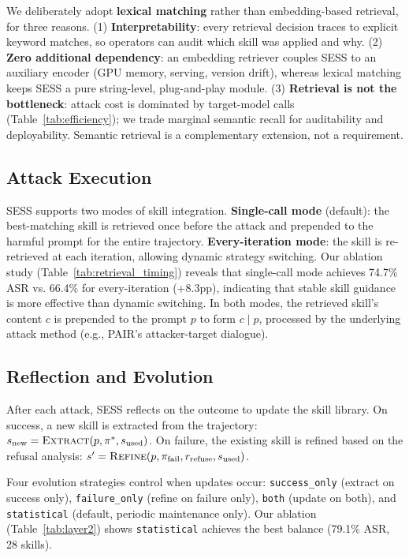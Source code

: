 \documentclass{article} %
\begin{document}
We deliberately adopt \textbf{lexical matching} rather than embedding-based retrieval, for three reasons. (1) \textbf{Interpretability}: every retrieval decision traces to explicit keyword matches, so operators can audit which skill was applied and why. (2) \textbf{Zero additional dependency}: an embedding retriever couples SESS to an auxiliary encoder (GPU memory, serving, version drift), whereas lexical matching keeps SESS a pure string-level, plug-and-play module. (3) \textbf{Retrieval is not the bottleneck}: attack cost is dominated by target-model calls (Table~\ref{tab:efficiency}); we trade marginal semantic recall for auditability and deployability. Semantic retrieval is a complementary extension, not a requirement.

\subsection{Attack Execution}

SESS supports two modes of skill integration. \textbf{Single-call mode} (default): the best-matching skill is retrieved once before the attack and prepended to the harmful prompt for the entire trajectory. \textbf{Every-iteration mode}: the skill is re-retrieved at each iteration, allowing dynamic strategy switching. Our ablation study (Table~\ref{tab:retrieval_timing}) reveals that single-call mode achieves 74.7\% ASR vs. 66.4\% for every-iteration (+8.3pp), indicating that stable skill guidance is more effective than dynamic switching. In both modes, the retrieved skill's content $c$ is prepended to the prompt $p$ to form $c \mathbin{|} p$, processed by the underlying attack method (e.g., PAIR's attacker-target dialogue).

\subsection{Reflection and Evolution}

After each attack, SESS reflects on the outcome to update the skill library. On success, a new skill is extracted from the trajectory: $s_{\text{new}} = \textsc{Extract}(p, \pi^*, s_{\text{used}})$. On failure, the existing skill is refined based on the refusal analysis: $s' = \textsc{Refine}(p, \pi_{\text{fail}}, r_{\text{refuse}}, s_{\text{used}})$.

Four evolution strategies control when updates occur: \texttt{success\_only} (extract on success only), \texttt{failure\_only} (refine on failure only), \texttt{both} (update on both), and \texttt{statistical} (default, periodic maintenance only). Our ablation (Table~\ref{tab:layer2}) shows \texttt{statistical} achieves the best balance (79.1\% ASR, 28 skills).
\end{document}
